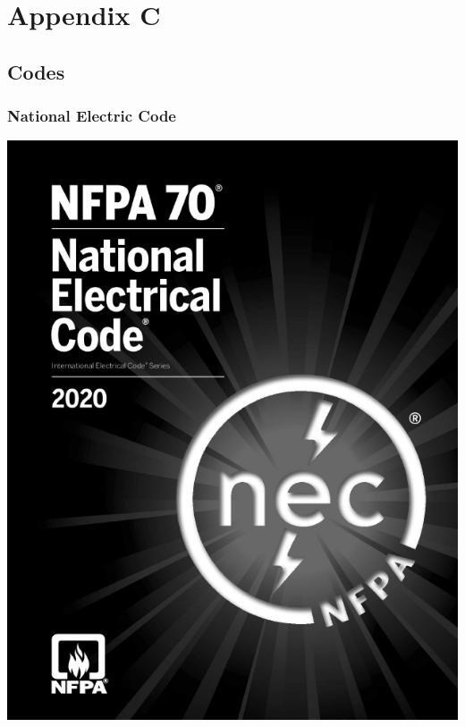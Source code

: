\chapter{Appendix C}
\section{Codes}
\subsection{National Electric Code}
\begin{center}
	\includegraphics[scale=0.5]{./images/nec2020}
\end{center}
\newpage
